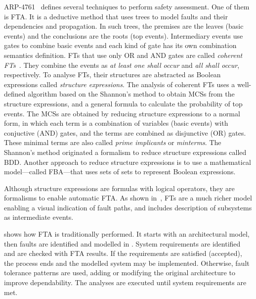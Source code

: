 \documentclass[12pt,openright,twoside,a4paper,oldfontcommands,english,brazil,final]{abntex2}
\theoremstyle{theo}
\begin{document}
ARP-4761~\cite{SAE1996b} defines several techniques to perform safety assessment.
One of them is \ac{FTA}.
It is a deductive method that uses trees to model faults and their dependencies and propagation.
In such trees, the premises are the leaves (basic events) and the conclusions are the roots (top events).
Intermediary events use gates to combine basic events and each kind of gate has its own combination semantics definition.
\Acp{FT} that use only \ac{OR} and \ac{AND} gates are called \emph{coherent \aclp{FT}}~\cite{Andrews2001,AB2003,Oliv2006,CCR2008,Vaurio2016}.
They combine the events as \emph{at least one shall occur} and \emph{all shall occur}, respectively.
To analyse \acp{FT}, their structures are abstracted as Boolean expressions called \emph{structure expressions}.
The analysis of coherent \acp{FT} uses a well-defined algorithm based on the Shannon's method to obtain \acp{MCS} from the structure expressions, and a general formula to calculate the probability of top events.
The \acp{MCS} are obtained by reducing structure expressions to a normal form, in which each term is a combination of variables (basic events) with conjuctive (\ac{AND}) gates, and the terms are combined as disjunctive (\ac{OR}) gates.
These minimal terms are also called \emph{prime implicants} or \emph{minterms}.
The Shannon's method originated a formalism to reduce structure expressions called \ac{BDD}.
Another approach to reduce structure expressions is to use a mathematical model---called \acf{FBA}---that uses sets of sets to represent Boolean expressions.

Although structure expressions are formulas with logical operators, they are formalisms to enable automatic \ac{FTA}.
As shown in~\cite{Ericson2005}, \acp{FT} are a much richer model enabling a visual indication of fault paths, and includes description of subsystems as intermediate events.

 shows how \ac{FTA} is traditionally performed.
It starts with an architectural model, then faults are identified and modelled in .
System requirements are identified and are checked with \ac{FTA} results.
If the requirements are satisfied (accepted), the process ends and the modelled system may be implemented.
Otherwise, fault tolerance patterns are used, adding or modifying the original architecture to improve dependability.
The analyses are executed until system requirements are met.
\end{document}
